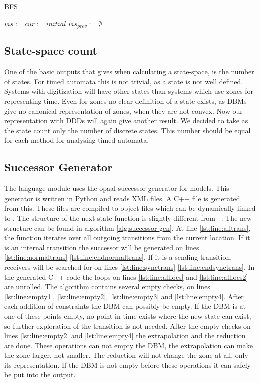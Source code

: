 \begin{algorithm}
\caption{BFS}\label{alg:bfs-no-minus}
\begin{algorithmic}[1]
	\State $vis := cur := initial$
	\State $vis_{prev} := \emptyset$
	\EndWhile
	
\EndProcedure	
\end{algorithmic}
\end{algorithm}

\subsection{State-space count}
One of the basic outputs that \ltsmin{} gives when calculating a state-space, is the number of states. For timed automata this is not trivial, as a state is not well defined. Systems with digitization will have other states than systems which use zones for representing time. Even for zones no clear definition of a state exists, as DBMs give no canonical representation of zones, when they are not convex. Now our representation with DDDs will again give another result. We decided to take as the state count only the number of discrete states. This number should be equal for each method for analysing timed automata.

\subsection{Successor Generator}
The language module uses the opaal successor generator for \uppaal{} models. This generator is written in Python and reads \uppaal{} XML files. A C++ file is generated from this. These files are compiled to object files which can be dynamically linked to \ltsmin{}. The structure of the next-state function is slightly different from ~\cite{eemcs21972}. The new structure can be found in algorithm \ref{alg:successor-gen}. At line \ref{lst:line:alltrans}, the function iterates over all outgoing transitions from the current location. If it is an internal transition the successor will be generated on lines \ref{lst:line:normaltrans}-\ref{lst:line:endnormaltrans}. If it is a sending transition, receivers will be searched for on lines \ref{lst:line:synctrans}-\ref{lst:line:endsynctrans}. In the generated C++ code the loops on lines \ref{lst:line:alllocs} and \ref{lst:line:alllocs2} are unrolled. The algorithm contains several empty checks, on lines \ref{lst:line:empty1},  \ref{lst:line:empty2}, \ref{lst:line:empty3} and \ref{lst:line:empty4}. After each addition of constraints the DBM can possibly be empty. If the DBM is at one of these points empty, no point in time exists where the new state can exist, so further exploration of the transition is not needed. After the empty checks on lines \ref{lst:line:empty2} and \ref{lst:line:empty4} the extrapolation and the reduction are done. These operations can not empty the DBM, the extrapolation can make the zone larger, not smaller. The reduction will not change the zone at all, only its representation. If the DBM is not empty before these operations it can safely be put into the output.

